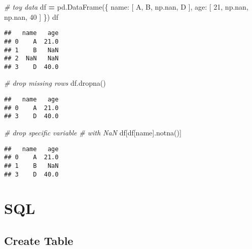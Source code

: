 \documentclass[
]{book}
\newenvironment{Shaded}{\begin{snugshade}}{\end{snugshade}}
\newcommand{\CommentTok}[1]{\textcolor[rgb]{0.56,0.35,0.01}{\textit{#1}}}
\newcommand{\DecValTok}[1]{\textcolor[rgb]{0.00,0.00,0.81}{#1}}
\newcommand{\NormalTok}[1]{#1}
\newcommand{\OperatorTok}[1]{\textcolor[rgb]{0.81,0.36,0.00}{\textbf{#1}}}
\newcommand{\StringTok}[1]{\textcolor[rgb]{0.31,0.60,0.02}{#1}}
\begin{document}
\begin{Shaded}
\begin{Highlighting}[]
\CommentTok{\# toy data}
\NormalTok{df }\OperatorTok{=}\NormalTok{ pd.DataFrame(\{}
    \StringTok{\textquotesingle{}name\textquotesingle{}}\NormalTok{: [}
        \StringTok{\textquotesingle{}A\textquotesingle{}}\NormalTok{, }\StringTok{\textquotesingle{}B\textquotesingle{}}\NormalTok{, np.nan, }\StringTok{\textquotesingle{}D\textquotesingle{}}
\NormalTok{    ],}
    \StringTok{\textquotesingle{}age\textquotesingle{}}\NormalTok{: [}
        \DecValTok{21}\NormalTok{, np.nan, np.nan, }\DecValTok{40}
\NormalTok{    ]    }
\NormalTok{\})}
\NormalTok{df}
\end{Highlighting}
\end{Shaded}

\begin{verbatim}
##   name   age
## 0    A  21.0
## 1    B   NaN
## 2  NaN   NaN
## 3    D  40.0
\end{verbatim}

\begin{Shaded}
\begin{Highlighting}[]
\CommentTok{\# drop missing rows}
\NormalTok{df.dropna()}
\end{Highlighting}
\end{Shaded}

\begin{verbatim}
##   name   age
## 0    A  21.0
## 3    D  40.0
\end{verbatim}

\begin{Shaded}
\begin{Highlighting}[]
\CommentTok{\# drop specific variable}
\CommentTok{\# with NaN}
\NormalTok{df[df[}\StringTok{\textquotesingle{}name\textquotesingle{}}\NormalTok{].notna()]}
\end{Highlighting}
\end{Shaded}

\begin{verbatim}
##   name   age
## 0    A  21.0
## 1    B   NaN
## 3    D  40.0
\end{verbatim}

\hypertarget{sql}{%
\chapter{SQL}\label{sql}}

\hypertarget{create-table}{%
\section{Create Table}\label{create-table}}
\end{document}
